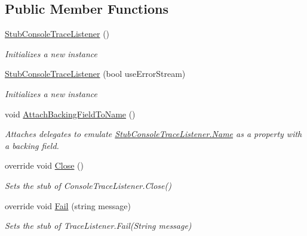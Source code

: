 \subsection*{Public Member Functions}
\begin{DoxyCompactItemize}
\item 
\hyperlink{class_system_1_1_diagnostics_1_1_fakes_1_1_stub_console_trace_listener_a6e420471cbf9a22edae42dcd9f06c3f7}{Stub\-Console\-Trace\-Listener} ()
\begin{DoxyCompactList}\small\item\em Initializes a new instance\end{DoxyCompactList}\item 
\hyperlink{class_system_1_1_diagnostics_1_1_fakes_1_1_stub_console_trace_listener_af0862cca4b242b2882ab55a8db9c98a4}{Stub\-Console\-Trace\-Listener} (bool use\-Error\-Stream)
\begin{DoxyCompactList}\small\item\em Initializes a new instance\end{DoxyCompactList}\item 
void \hyperlink{class_system_1_1_diagnostics_1_1_fakes_1_1_stub_console_trace_listener_a072735512ba458acc695c6636c892eaf}{Attach\-Backing\-Field\-To\-Name} ()
\begin{DoxyCompactList}\small\item\em Attaches delegates to emulate \hyperlink{class_system_1_1_diagnostics_1_1_fakes_1_1_stub_console_trace_listener_a47f3547cd380d01765a3ac32eb402f63}{Stub\-Console\-Trace\-Listener.\-Name} as a property with a backing field.\end{DoxyCompactList}\item 
override void \hyperlink{class_system_1_1_diagnostics_1_1_fakes_1_1_stub_console_trace_listener_acf30a6605a18b6abea09c44d641e0ed0}{Close} ()
\begin{DoxyCompactList}\small\item\em Sets the stub of Console\-Trace\-Listener.\-Close()\end{DoxyCompactList}\item 
override void \hyperlink{class_system_1_1_diagnostics_1_1_fakes_1_1_stub_console_trace_listener_aa0081cfb89560db057f0f5df5e860cb1}{Fail} (string message)
\begin{DoxyCompactList}\small\item\em Sets the stub of Trace\-Listener.\-Fail(\-String message)\end{DoxyCompactList}\item 

\end{DoxyCompactItemize}
